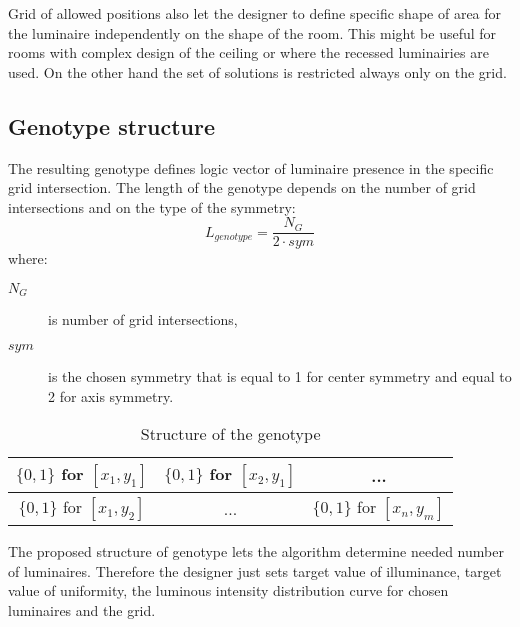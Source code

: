 Grid of allowed positions also let the designer to define specific shape of area for the luminaire independently on the shape of the room. This might be useful for rooms with complex design of the ceiling or where the recessed luminairies are used. On the other hand the set of solutions is restricted always only on the grid.

\subsection{Genotype structure}
\label{ssec:genotypeStruc}
The resulting genotype defines logic vector of luminaire presence in the specific grid intersection. The length of the genotype depends on the number of grid intersections and on the type of the symmetry:
\begin{equation}
\label{eq:genotypeLength}
L_{genotype} = \frac{N_G}{2\cdot sym}
\end{equation}
where:
\begin{description}
	\item[$N_G$] is number of grid intersections,
	\item[$sym$] is the chosen symmetry that is equal to 1 for center symmetry and equal to 2 for axis symmetry.
\end{description}

\begin{table}[htb]
	\renewcommand{\arraystretch}{1.3}
	\caption{Structure of the genotype}
 	\label{tab:strucgenotype}
	\centering
  \begin{tabular}{| c | c | c |}
    \hline
    $\lbrace0,1\rbrace$ for $[x_1,y_1]$ & $\lbrace0,1\rbrace$ for $[x_2,y_1]$ & ... \\
    \hline
    $\lbrace0,1\rbrace$ for $[x_1,y_2]$ & ... & $\lbrace0,1\rbrace$ for $[x_n,y_m]$ \\
    \hline
  \end{tabular}
\end{table}

The proposed structure of genotype lets the algorithm determine needed number of luminaires. Therefore the designer just sets target value of illuminance, target value of uniformity, the luminous intensity distribution curve for chosen luminaires and the grid.